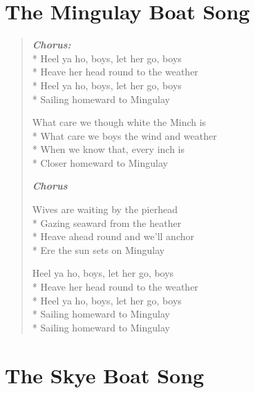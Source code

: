 \documentclass[9pt,twoside]{extarticle}
\newenvironment{xverse}{
	\begin{verse}
	\fontsize{8.5}{10.5}\selectfont
	}
	{
	\end{verse}
	\penalty 0
}
\newcommand{\chorusdef}{\textbf{\emph{Chorus:}}\\*}
\newcommand{\chorusmark}[1][1]{%
\vspace{-0.5\stanzaskip}%
\textbf{\emph{Chorus \ifthenelse{\equal{#1}{1}}{}{$\times$ #1}}}%
\vspace{-0.5\stanzaskip}%
}
\begin{document}
\section{The Mingulay Boat Song}

\begin{xverse}
\chorusdef
Heel ya ho, boys, let her go, boys \\*
Heave her head round to the weather \\*
Heel ya ho, boys, let her go, boys \\*
Sailing homeward to Mingulay

What care we though white the Minch is \\*
What care we boys the wind and weather \\*
When we know that, every inch is \\*
Closer homeward to Mingulay

\chorusmark

Wives are waiting by the pierhead \\*
Gazing seaward from the heather \\*
Heave ahead round and we’ll anchor \\*
Ere the sun sets on Mingulay

Heel ya ho, boys, let her go, boys \\*
Heave her head round to the weather \\*
Heel ya ho, boys, let her go, boys \\*
Sailing homeward to Mingulay \\*
Sailing homeward to Mingulay
\end{xverse}


\section{The Skye Boat Song}
\end{document}
